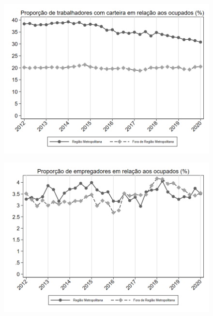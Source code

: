 \begin{frame}[label=_composicao_demografica_regiao_metro_prop_empregadoCC]{}
\textit{\hyperlink{_composicao_demografica_regiao_metro}{}}
\begin{figure}
  \centering
  \includegraphics[width=1.0\linewidth]{../../analysis/output/composicao_demografica/area_geografica/_composicao_demografica_regiao_metro_prop_empregadoCC.png}
  \caption{}
  \label{fig:_composicao_demografica_regiao_metro_prop_empregadoCC}
\end{figure}
\end{frame}

\begin{frame}[label=_composicao_demografica_regiao_metro_prop_empregador]{}
\textit{\hyperlink{_composicao_demografica_regiao_metro}{}}
\begin{figure}
  \centering
  \includegraphics[width=1.0\linewidth]{../../analysis/output/composicao_demografica/area_geografica/_composicao_demografica_regiao_metro_prop_empregador.png}
  \caption{}
  \label{fig:_composicao_demografica_regiao_metro_prop_empregador}
\end{figure}
\end{frame}



